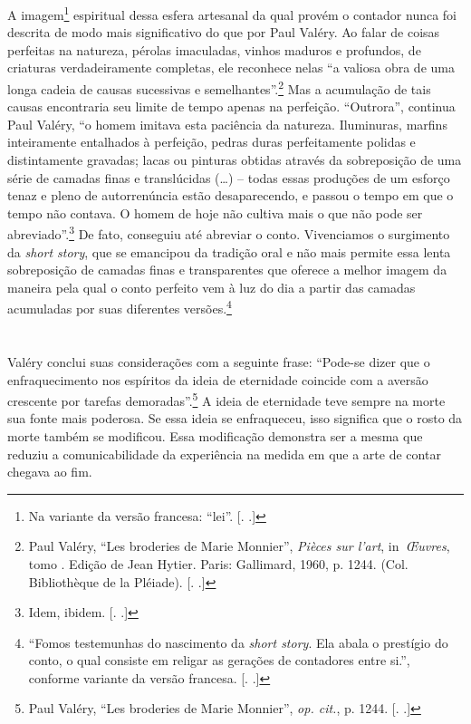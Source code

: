 A imagem\footnote{Na variante da versão francesa: ``lei''. [. 
.]} espiritual dessa esfera artesanal da qual provém o contador
nunca foi descrita de modo mais significativo do que por Paul Valéry. Ao
falar de coisas perfeitas na natureza, pérolas imaculadas, vinhos
maduros e profundos, de criaturas verdadeiramente completas, ele
reconhece nelas ``a valiosa obra de uma longa cadeia de causas
sucessivas e semelhantes''.\footnote{Paul Valéry, ``Les broderies de
  Marie Monnier'', \emph{Pièces sur l'art}, in~\emph{Œuvres}, tomo .
  Edição de Jean Hytier. Paris: Gallimard, 1960, p. 1244. (Col.
  Bibliothèque de la Pléiade). [. .]} Mas a acumulação de tais
causas encontraria seu limite de tempo apenas na perfeição. ``Outrora'',
continua Paul Valéry, ``o homem imitava esta paciência da natureza.
Iluminuras, marfins inteiramente entalhados à perfeição, pedras duras
perfeitamente polidas e distintamente gravadas; lacas ou pinturas
obtidas através da sobreposição de uma série de camadas finas e
translúcidas (\ldots{}) -- todas essas produções de um esforço tenaz e pleno
de autorrenúncia estão desaparecendo, e passou o tempo em que o tempo
não contava. O homem de hoje não cultiva mais o que não pode ser
abreviado''.\footnote{Idem, ibidem. [. .]} De fato, conseguiu
até abreviar o conto. Vivenciamos o surgimento da \emph{short story},
que se emancipou da tradição oral e não mais permite essa lenta
sobreposição de camadas finas e transparentes que oferece a melhor
imagem da maneira pela qual o conto perfeito vem à luz do dia a partir
das camadas acumuladas por suas diferentes versões\label{supra7}.\footnote{``Fomos
  testemunhas do nascimento da \emph{short story}. Ela abala o prestígio
  do conto, o qual consiste em religar as gerações de contadores entre
  si.'', conforme variante da versão francesa. [. .]}

\section{}

Valéry conclui suas considerações com a seguinte frase: ``Pode-se dizer
que o enfraquecimento nos espíritos da ideia de eternidade coincide com
a aversão crescente por tarefas demoradas''.\footnote{Paul Valéry, ``Les
  broderies de Marie Monnier'', \emph{op. cit.}, p. 1244. [. .]}
A ideia de eternidade teve sempre na morte sua fonte mais poderosa. Se
essa ideia se enfraqueceu, isso significa que o rosto da morte também se
modificou. Essa modificação demonstra ser a mesma que reduziu a
comunicabilidade da experiência na medida em que a arte de contar
chegava ao fim.

